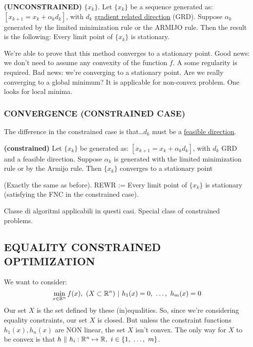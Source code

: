 \begin{thrm}{\textbf{(UNCONSTRAINED)}} \newline
$\{x_k\}$. Let $\{x_k\}$ be a sequence generated as: $[x_{k+1}=x_k+\alpha_kd_k]$, with $d_k$ \underline{gradient related direction} (GRD). Suppose $\alpha_k$ generated by the limited minimization rule or the ARMIJO rule. Then the result is the following: Every limit point of $\{x_k\}$ is stationary.
\end{thrm}

We're able to prove that this method converges to a stationary point. Good news: we don't need to assume any convexity of the function $f$. A some regularity is required. Bad news: we're converging to a stationary point. Are we really converging to a global minimum? It is applicable for non-convex problem. One looks for local minima.

\subsubsection{CONVERGENCE (CONSTRAINED CASE)}

The difference in the constrained case is that\dots $d_k$ must be a \underline{feasible direction}.
\begin{thrm}{\textbf{(constrained)}} \newline
Let $\{x_k\}$ be generated as: $[x_{k+1}=x_k+\alpha_kd_k]$, with $d_k$ GRD and a feasible direction. Suppose $\alpha_k$ is generated with the limited minimization rule or by the Armijo rule. Then $\{x_k\}$ converges to a stationary point
\end{thrm}

(Exactly the same as before). REWR := Every limit point of $\{x_k\}$ is stationary (satisfying the FNC in the constrained case).

Classe di algoritmi applicabili in questi casi. Special class of constrained problems.

\subsection{EQUALITY CONSTRAINED OPTIMIZATION}

We want to consider:
\[
	\min_{x\in\mathbb{R}^n}{f(x)},\ (X\subset\mathbb{R}^n)\ |\ h_1(x) = 0,\ \dots,\ h_m(x) = 0
\]
Our set $X$ is the set defined by these (in)equalities. So, since we're considering equality constraints, our set $X$ is closed. But unless the constraint functions $h_1(x),h_n(x)$ are NON linear, the set $X$ isn't convex. The only way for $X$ to be convex is that $h\ \|\ h_i:\R^n\mapsto\R,\ i\in\{1,\ \dots,\ m\}$.

